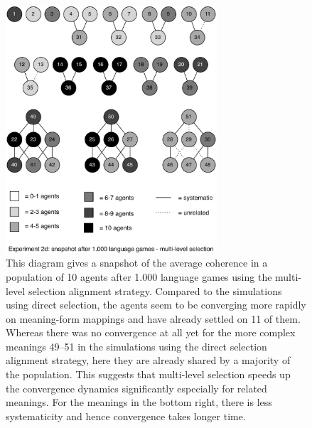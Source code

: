 \begin{figure}[p]
\centerline{\includegraphics[width=0.7\textwidth]{Chapter4/figs/multilevel-coherence-no-analogy-1000}}
  \caption[Experiment 2: snapshot after 1.000 games (multi-level selection)]{This diagram gives a snapshot of the average coherence in a population of 10 agents after 1.000 language games using the multi-level selection alignment strategy. Compared to the simulations using direct selection, the agents seem to be converging more rapidly on meaning-form mappings and have already settled on 11 of them. Whereas there was no convergence at all yet for the more complex meanings 49--51 in the simulations using the direct selection alignment strategy, here they are already shared by a majority of the population. This suggests that multi-level selection speeds up the convergence dynamics significantly especially for related meanings. For the meanings in the bottom right, there is less systematicity and hence convergence takes longer time.}
   \label{f:2d-coherence-1000}
\end{figure}
